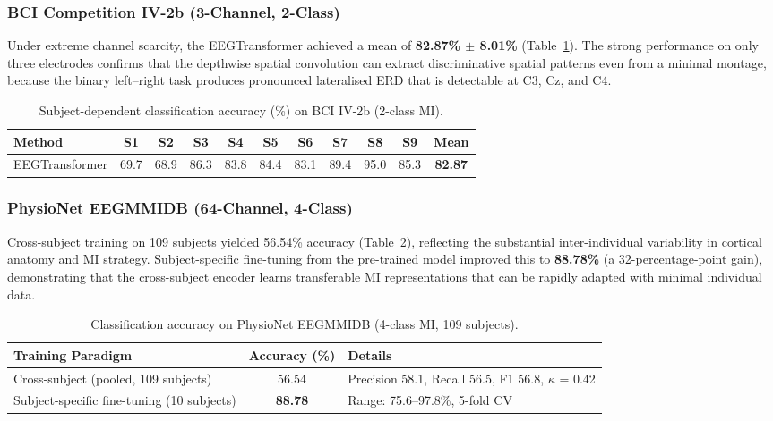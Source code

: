 \documentclass[12pt, a4paper]{article}
\begin{document}
\subsubsection{BCI Competition IV-2b (3-Channel, 2-Class)}

Under extreme channel scarcity, the EEGTransformer achieved a mean of \textbf{82.87\% $\pm$ 8.01\%} (Table~\ref{tab:iv2b_results}). The strong performance on only three electrodes confirms that the depthwise spatial convolution can extract discriminative spatial patterns even from a minimal montage, because the binary left--right task produces pronounced lateralised ERD that is detectable at C3, Cz, and C4.

\begin{table}[htbp]
\centering
\caption{Subject-dependent classification accuracy (\%) on BCI IV-2b (2-class MI).}
\label{tab:iv2b_results}
\begin{tabular}{lcccccccccc}
\toprule
\textbf{Method} & \textbf{S1} & \textbf{S2} & \textbf{S3} & \textbf{S4} & \textbf{S5} & \textbf{S6} & \textbf{S7} & \textbf{S8} & \textbf{S9} & \textbf{Mean} \\
\midrule
EEGTransformer & 69.7 & 68.9 & 86.3 & 83.8 & 84.4 & 83.1 & 89.4 & 95.0 & 85.3 & \textbf{82.87} \\
\bottomrule
\end{tabular}
\end{table}

\subsubsection{PhysioNet EEGMMIDB (64-Channel, 4-Class)}

Cross-subject training on 109 subjects yielded 56.54\% accuracy (Table~\ref{tab:physionet_results}), reflecting the substantial inter-individual variability in cortical anatomy and MI strategy. Subject-specific fine-tuning from the pre-trained model improved this to \textbf{88.78\%} (a 32-percentage-point gain), demonstrating that the cross-subject encoder learns transferable MI representations that can be rapidly adapted with minimal individual data.

\begin{table}[htbp]
\centering
\caption{Classification accuracy on PhysioNet EEGMMIDB (4-class MI, 109 subjects).}
\label{tab:physionet_results}
\begin{tabular}{@{} l c >{\raggedright\arraybackslash}p{6.5cm} @{}}
\toprule
\textbf{Training Paradigm} & \textbf{Accuracy (\%)} & \textbf{Details} \\
\midrule
Cross-subject (pooled, 109 subjects) & 56.54 & Precision 58.1, Recall 56.5, F1 56.8, $\kappa$ = 0.42 \\
Subject-specific fine-tuning (10 subjects) & \textbf{88.78} & Range: 75.6--97.8\%, 5-fold CV \\
\bottomrule
\end{tabular}
\end{table}
\end{document}
